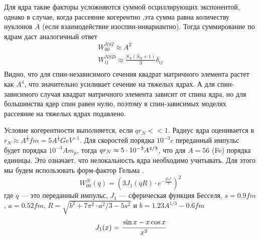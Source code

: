 Для ядра такие факторы усложняются суммой осциллирующих экспонентой, однако в случае, когда рассеяние когерентно ,эта сумма равна количеству нуклонов $A$ (если взаимодействие изоспин-инвариантно). Тогда суммирование по ядрам даст аналогичный ответ
\begin{equation}
	\begin{split}
		W^{N SI}_{00} \approx A^2 \\ 
		W^{N SD}_{ij} \approx \frac{S_{N}(S_{N}+1)}{3} \delta_{ij} \\
	\end{split}
\end{equation}
Видно, что для спин-независимого сечения квадрат матричного элемента растет как $A^4$, что значительно усиливает сечение на тяжелых ядрах. А для спин-зависимого случая квадрат матричного элемента зависит от спина ядра, но для большинства ядер спин равен нулю, поэтому в спин-зависимых моделях рассеяние на тяжелых ядрах подавлено.

Условие когерентности выполняется, если $q r_N << 1$. Радиус ядра оценивается в $r_N \approx A^{\frac{1}{3}} fm = 5 A^{\frac{1}{3}} GeV^{-1}$. Для скоростей порядка $10^{-3} c$ переданный импульс будет порядка $10^{-3}A m_p$, тогда $qr_N \approx {5}\cdot 10^{-3}A^{4/3}$, что для $A=56$ (Fe) порядка единицы. Это означает, что нелокальность ядра необходимо учитывать. Для этого мы будем использовать форм-фактор Гельма \cite{D_da_2007}.
\begin{equation}
	\label{eq:form_factor}
	W^N_{00}(q) = \left(3J_1(qR)\cdot e^{-\frac{q^2s^2}{2}}\right)^2
\end{equation}
где $q$ --- это переданный импульс, $J_1$ --- сферическая функция Бесселя, $s = 0.9 fm$, $a = 0.52 fm$, $R = \sqrt{b^2+7\pi^2\cdot a^2/3-5s^2}$ и $b = 1.23 A^{1/3} - 0.6 fm$
\begin{equation}
	J_1(x) = \cfrac{\sin{x}-x \cos{x}}{x^2} 
\end{equation}


